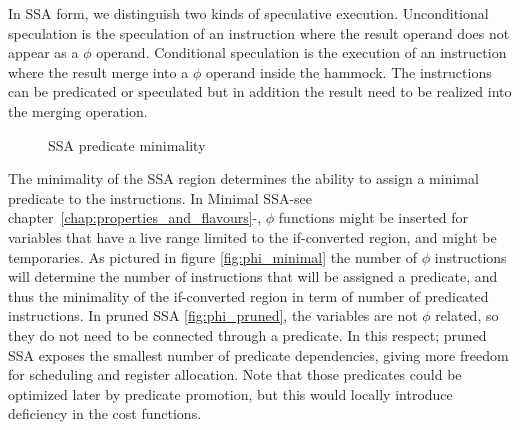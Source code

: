 In SSA form, we distinguish two kinds of speculative execution. Unconditional speculation is the speculation of an instruction where the result operand does not appear as a $\phi$ operand. Conditional speculation is the execution of an instruction where the result merge into a $\phi$ operand inside the hammock. The instructions can be predicated or speculated but in addition the result need to be realized into the merging operation.

\begin{figure}[h]
\centering
\caption{SSA predicate minimality}
\label{fig:minimality}
\end{figure}

The minimality of the SSA region determines the ability to assign a minimal predicate to the instructions. In Minimal SSA-see chapter~\ref{chap:properties_and_flavours}-, $\phi$ functions might be inserted for variables that have a live range limited to the if-converted region, and might be temporaries. As pictured in figure \ref{fig:phi_minimal} the number of $\phi$ instructions will determine the number of instructions that will be assigned a predicate, and thus the minimality of the if-converted region in term of number of predicated instructions. In pruned SSA \ref{fig:phi_pruned}, the variables are not $\phi$ related, so they do not need to be connected through a predicate. In this respect; pruned SSA exposes the smallest number of predicate dependencies, giving more freedom for scheduling and register allocation. Note that those predicates could be optimized later by predicate promotion, but this would locally introduce deficiency in the cost functions.

